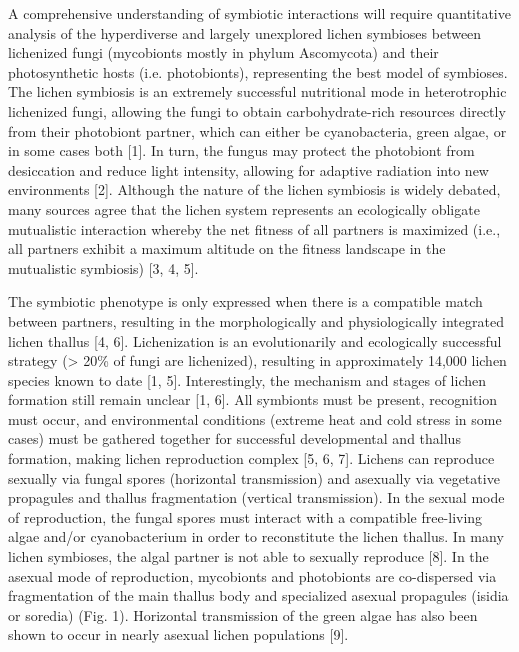 \documentclass[runningheads,a4paper]{llncs}
\begin{document}
A comprehensive understanding of symbiotic interactions will require quantitative analysis of the hyperdiverse and largely unexplored lichen symbioses between lichenized fungi (mycobionts mostly in phylum Ascomycota) and their photosynthetic hosts (i.e. photobionts), representing the best model of symbioses. The lichen symbiosis is an extremely successful nutritional mode in heterotrophic lichenized fungi, allowing the fungi to obtain carbohydrate-rich resources directly from their photobiont partner, which can either be cyanobacteria, green algae, or in some cases both [1]. In turn, the fungus may protect the photobiont from desiccation and reduce light intensity, allowing for adaptive radiation into new environments [2]. Although the nature of the lichen symbiosis is widely debated, many sources agree that the lichen system represents an ecologically obligate mutualistic interaction whereby the net fitness of all partners is maximized (i.e., all partners exhibit a maximum altitude on the fitness landscape in the mutualistic symbiosis) [3, 4, 5]. 

The symbiotic phenotype is only expressed when there is a compatible match between partners, resulting in the morphologically and physiologically integrated lichen thallus [4, 6]. Lichenization is an evolutionarily and ecologically successful strategy (> 20\% of fungi are lichenized), resulting in approximately 14,000  lichen species known to date [1, 5]. Interestingly, the mechanism and stages of lichen formation still remain unclear [1, 6]. All symbionts must be present, recognition must occur, and environmental conditions (extreme heat and cold stress in some cases) must be gathered together for successful developmental and thallus formation, making lichen reproduction complex [5, 6, 7]. Lichens can reproduce sexually via fungal spores (horizontal transmission) and asexually via vegetative propagules and thallus fragmentation (vertical transmission). In the sexual mode of reproduction, the fungal spores must interact with a compatible free-living algae and/or cyanobacterium in order to reconstitute the lichen thallus. In many lichen symbioses, the algal partner is not able to sexually reproduce [8]. In the asexual mode of reproduction, mycobionts and photobionts are co-dispersed via fragmentation of the main thallus body and specialized asexual propagules (isidia or soredia) (Fig. 1). Horizontal transmission of the green algae has also been shown to occur in nearly asexual lichen populations [9]. 
\end{document}
